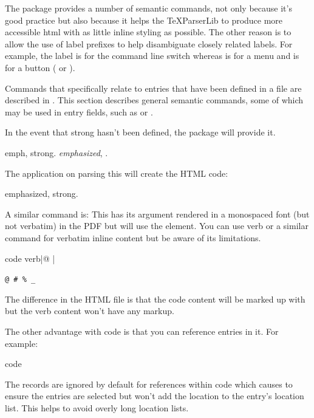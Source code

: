 \documentclass[toc=listof]{scrreport}
\begin{document}
The  package provides a number of semantic commands, not only
because it's good practice but also because it helps the \gls{TeXParserLib} to
produce more accessible \gls{html} with as little inline styling as possible.
The other reason is to allow the use of label prefixes to help disambiguate
closely related labels.  For example, the label  is for the
command line switch  whereas  is for a 
menu and  is for a button ( or
).

Commands that specifically relate to entries that have been defined
in a  file are described in .
This section describes general semantic commands, some of which may
be used in entry fields, such as  or
.

In the event that \gls{strong} hasn't been defined, the
 package will provide it.
\begin{coderesult}
\gls{emph},
\gls{strong}.
\tcblower
\emph{emphasized},
.
\end{coderesult}

The  application on parsing this will create the HTML code:
\begin{compactcodebox*}
emphasized,
strong.
\end{compactcodebox*}

A similar command is:
This has its argument rendered in a monospaced font (but not
verbatim) in the PDF but  will use the
 element. You can use \gls{verb} or a similar command for
verbatim inline content but be aware of its limitations.
\begin{coderesult}
\gls{code}
\codepar
\gls{verb}|@   |
\tcblower
{}

\verb|@ # % _|
\end{coderesult}
The difference in the HTML file is that the \gls{code} content will
be marked up with  but the \gls{verb} content won't
have any markup.

The other advantage with \gls{code} is that you can reference
entries in it. For example:
\begin{coderesult}
\gls{code}
\tcblower
{}
\end{coderesult}
The records are ignored by default for references within \gls{code}
which causes  to ensure the entries are selected but
won't add the location to the entry's location list. This helps to
avoid overly long location lists.
\end{document}
